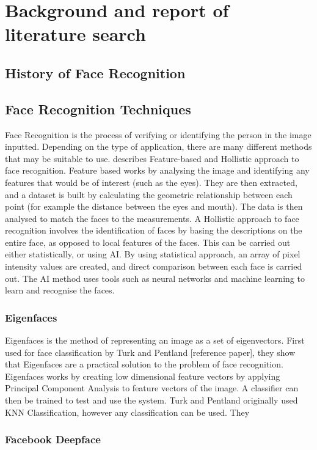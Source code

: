 \documentclass[12pt, a4paper]{article}
\begin{document}
\newpage
\section{Background and report of literature search}
\subsection{History of Face Recognition}

\subsection{Face Recognition Techniques}
Face Recognition is the process of verifying or identifying the person in the image inputted. Depending on the type of application, there are many different methods that may be suitable to use. \cite{facesurvey} describes Feature-based and Hollistic approach to face recognition. Feature based works by analysing the image and identifying any features that would be of interest (such as the eyes). They are then extracted, and a dataset is built by calculating the geometric relationship between each point (for example the distance between the eyes and mouth). The data is then analysed to match the faces to the measurements. A Hollistic approach to face recognition involves the identification of faces by basing the descriptions on the entire face, as opposed to local features of the faces. This can be carried out either statistically, or using AI. By using statistical approach, an array of pixel intensity values are created, and direct comparison between each face is carried out. The AI method uses tools such as neural networks and machine learning to learn and recognise the faces.
\subsubsection{Eigenfaces}
Eigenfaces is the method of representing an image as a set of eigenvectors. First used for face classification by Turk and Pentland [reference paper],  they show that Eigenfaces are a practical solution to the problem of face recognition. Eigenfaces works by creating low dimensional feature vectors by applying Principal Component Analysis to feature vectors of the image. A classifier can then be trained to test and use the system. Turk and Pentland originally used KNN Classification, however any classification can be used. They 
\subsubsection{Facebook Deepface}
\end{document}
